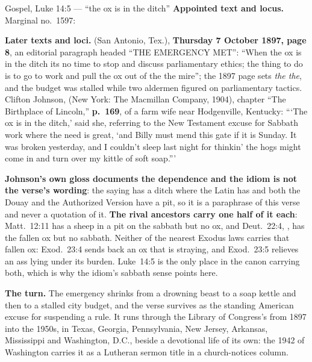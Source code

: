 \begin{afterlife}{Gospel, Luke 14:5 --- ``the ox is in the ditch''}
\textbf{Appointed text and locus.} Marginal no.~1597: 

\textbf{Later texts and loci.}  (San Antonio,
Tex.), \textbf{Thursday 7 October 1897, page 8}, an editorial paragraph headed
``THE EMERGENCY MET'': ``When the ox is in the ditch its no time to stop and
discuss parliamentary ethics; the thing to do is to go to work and pull the ox
out of the the mire''; the 1897 page sets \emph{the the}, and the budget was
stalled while two aldermen figured on parliamentary tactics. Clifton
Johnson,  (New York: The Macmillan
Company, 1904), chapter ``The Birthplace of Lincoln,'' \textbf{p.~169}, of a
farm wife near Hodgenville, Kentucky: ```The ox is in the ditch,' said she,
referring to the New Testament excuse for Sabbath work where the need is great,
`and Billy must mend this gate if it is Sunday. It was broken yesterday, and I
couldn't sleep last night for thinkin' the hogs might come in and turn over my
kittle of soft soap.'''

\textbf{Johnson's own gloss documents the dependence and the idiom is not the
verse's wording}: the saying has a ditch where the Latin has  and
both the Douay and the Authorized Version have a pit, so it is a paraphrase of
this verse and never a quotation of it. \textbf{The rival ancestors carry one
half of it each}: Matt.~12:11 has a sheep in a pit on the sabbath but no ox,
and Deut.~22:4, , has the fallen ox but no sabbath. Neither of the nearest Exodus laws
carries that fallen ox: Exod.~23:4 sends back an ox that is straying, and
Exod.~23:5 relieves an ass lying under its burden. Luke~14:5 is the only place
in the canon carrying both, which is why the idiom's sabbath sense points
here.

\textbf{The turn.} The emergency shrinks from a drowning beast to a soap kettle
and then to a stalled city budget, and the verse survives as the standing
American excuse for suspending a rule. It runs through the Library of
Congress's  from 1897 into the 1950s, in Texas,
Georgia, Pennsylvania, New Jersey, Arkansas, Mississippi and Washington, D.C.,
beside a devotional life of its own: the 1942  of Washington
carries it as a Lutheran sermon title in a church-notices column.
\end{afterlife}

